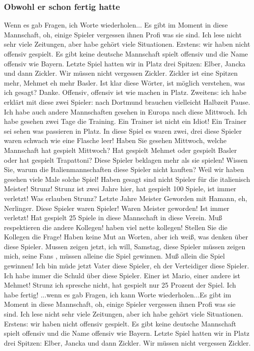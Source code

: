 \subsubsection{Obwohl er schon fertig hatte}
Wenn es gab Fragen, ich Worte wiederholen... Es gibt im Moment in diese Mannschaft, oh, einige Spieler vergessen ihnen Profi was sie sind. Ich lese nicht sehr viele Zeitungen, aber habe gehört viele Situationen. Erstens: wir haben nicht offensiv gespielt. Es gibt keine deutsche Mannschaft spielt offensiv und die Name offensiv wie Bayern. Letzte Spiel hatten wir in Platz drei Spitzen: Elber, Jancka und dann Zickler. Wir müssen nicht vergessen Zickler. Zickler ist eine Spitzen mehr, Mehmet eh mehr Basler. Ist klar diese Wörter, ist möglich verstehen, was ich gesagt? Danke. Offensiv, offensiv ist wie machen in Platz. Zweitens: ich habe erklärt mit diese zwei Spieler: nach Dortmund brauchen vielleicht Halbzeit Pause. Ich habe auch andere Mannschaften gesehen in Europa nach diese Mittwoch. Ich habe gesehen zwei Tage die Training. Ein Trainer ist nicht ein Idiot! Ein Trainer sei sehen was passieren in Platz. In diese Spiel es waren zwei, drei diese Spieler waren schwach wie eine Flasche leer! Haben Sie gesehen Mittwoch, welche Mannschaft hat gespielt Mittwoch? Hat gespielt Mehmet oder gespielt Basler oder hat gespielt Trapattoni? Diese Spieler beklagen mehr als sie spielen! Wissen Sie, warum die Italienmannschaften diese Spieler nicht kauften? Weil wir haben gesehen viele Male solche Spiel! Haben gesagt sind nicht Spieler für die italienisch Meister! Strunz! Strunz ist zwei Jahre hier, hat gespielt 100 Spiele, ist immer verletzt! Was erlauben Strunz? Letzte Jahre Meister Geworden mit Hamann, eh, Nerlinger. Diese Spieler waren Spieler! Waren Meister geworden! Ist immer verletzt! Hat gespielt 25 Spiele in diese Mannschaft in diese Verein. Muß respektieren die andere Kollegen! haben viel nette kollegen! Stellen Sie die Kollegen die Frage! Haben keine Mut an Worten, aber ich weiß, was denken über diese Spieler. Mussen zeigen jetzt, ich will, Samstag, diese Spieler müssen zeigen mich, seine Fans , müssen alleine die Spiel gewinnen. Muß allein die Spiel gewinnen! Ich bin müde jetzt Vater diese Spieler, eh der Verteidiger diese Spieler. Ich habe immer die Schuld über diese Spieler. Einer ist Mario, einer andere ist Mehmet! Strunz ich spresche nicht, hat gespielt nur 25 Prozent der Spiel. Ich habe fertig! ...wenn es gab Fragen, ich kann Worte wiederholen...Es gibt im Moment in diese Mannschaft, oh, einige Spieler vergessen ihnen Profi was sie sind. Ich lese nicht sehr viele Zeitungen, aber ich habe gehört viele Situationen. Erstens: wir haben nicht offensiv gespielt. Es gibt keine deutsche Mannschaft spielt offensiv und die Name offensiv wie Bayern. Letzte Spiel hatten wir in Platz drei Spitzen: Elber, Jancka und dann Zickler. Wir müssen nicht vergessen Zickler.
